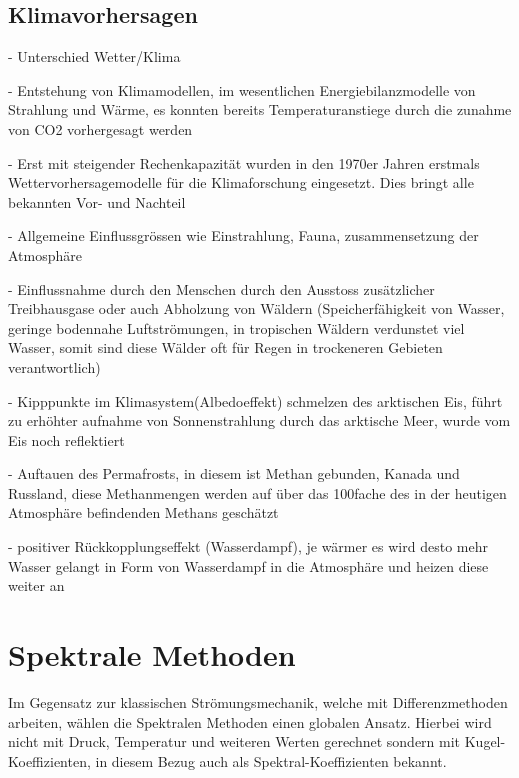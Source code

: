 \begin{refsection}
\subsection{Klimavorhersagen
\label{subsection:klima:entstehung}}

- Unterschied Wetter/Klima

- Entstehung von Klimamodellen, im wesentlichen Energiebilanzmodelle von Strahlung und Wärme, es konnten bereits Temperaturanstiege durch die zunahme von CO2 vorhergesagt werden

- Erst mit steigender Rechenkapazität wurden in den 1970er Jahren erstmals Wettervorhersagemodelle für die Klimaforschung eingesetzt. Dies bringt alle bekannten Vor- und Nachteil
 
- Allgemeine Einflussgrössen wie Einstrahlung, Fauna, zusammensetzung der Atmosphäre

- Einflussnahme durch den Menschen durch den Ausstoss zusätzlicher Treibhausgase oder auch Abholzung von Wäldern (Speicherfähigkeit von Wasser, geringe bodennahe Luftströmungen, in tropischen Wäldern verdunstet viel Wasser, somit sind diese Wälder oft für Regen in trockeneren Gebieten verantwortlich) 

- Kipppunkte im Klimasystem(Albedoeffekt) schmelzen des arktischen Eis, führt zu erhöhter aufnahme von Sonnenstrahlung durch das arktische Meer, wurde vom Eis noch reflektiert

- Auftauen des Permafrosts, in diesem ist Methan gebunden, Kanada und Russland, diese Methanmengen werden auf über das 100fache des in der heutigen Atmosphäre befindenden Methans geschätzt

- positiver Rückkopplungseffekt (Wasserdampf), je wärmer es wird desto mehr Wasser gelangt in Form von Wasserdampf in die Atmosphäre und heizen diese weiter an




\section{Spektrale Methoden
\label{section:klima:spektrale}}
Im Gegensatz zur klassischen Strömungsmechanik, welche mit Differenzmethoden arbeiten, wählen die Spektralen Methoden einen globalen Ansatz. Hierbei wird nicht mit Druck, Temperatur und weiteren Werten gerechnet sondern mit Kugel-Koeffizienten, in diesem Bezug auch als Spektral-Koeffizienten bekannt.




\end{refsection}
